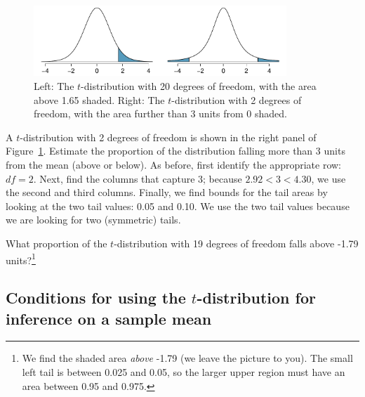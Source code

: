 \begin{figure}
\centering
\includegraphics[width=0.85\textwidth]{ch_inference_for_means/figures/tDistDF20RightTail1Point65/tDistDF20RightTail1Point65}
\caption{Left: The $t$-distribution with 20 degrees of freedom, with the area above 1.65 shaded. Right: The $t$-distribution with 2 degrees of freedom, with the area further than 3 units from 0 shaded.}
\label{tDistDF20RightTail1Point65}
\end{figure}

\begin{example}{A $t$-distribution with 2 degrees of freedom is shown in the right panel of Figure~\ref{tDistDF20RightTail1Point65}. Estimate the proportion of the distribution falling more than 3 units from the mean (above or below).}
As before, first identify the appropriate row: $df=2$. Next, find the columns that capture 3; because $2.92 < 3 < 4.30$, we use the second and third columns. Finally, we find bounds for the tail areas by looking at the two tail values: 0.05 and 0.10. We use the two tail values because we are looking for two (symmetric) tails.
\end{example}

\begin{exercise}
What proportion of the $t$-distribution with 19 degrees of freedom falls above -1.79 units?\footnote{We find the shaded area \emph{above} -1.79 (we leave the picture to you). The small left tail is between 0.025 and 0.05, so the larger upper region must have an area between 0.95 and 0.975.}


\end{exercise}



\subsection{Conditions for using the $t$-distribution for inference on a sample mean}
\label{tDistSolutionToSEProblem}

